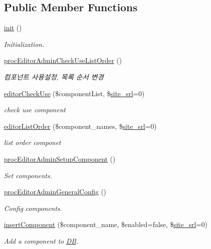 \subsection*{Public Member Functions}
\begin{DoxyCompactItemize}
\item 
\hyperlink{classeditorAdminController_ad93d747ea21b3414d423dcb8b3b54760}{init} ()
\begin{DoxyCompactList}\small\item\em Initialization. \end{DoxyCompactList}\item 
\hyperlink{classeditorAdminController_a00e9dceb8f8bc86baf8edbac76e3d5fd}{proc\+Editor\+Admin\+Check\+Use\+List\+Order} ()
\begin{DoxyCompactList}\small\item\em 컴포넌트 사용설정, 목록 순서 변경 \end{DoxyCompactList}\item 
\hyperlink{classeditorAdminController_ae4663ef7946d055274d39810ef76198a}{editor\+Check\+Use} (\$component\+List, \$\hyperlink{ko_8install_8php_a8b1406b4ad1048041558dce6bfe89004}{site\+\_\+srl}=0)
\begin{DoxyCompactList}\small\item\em check use component \end{DoxyCompactList}\item 
\hyperlink{classeditorAdminController_a531785272cc7a46e86dce7a308a18286}{editor\+List\+Order} (\$component\+\_\+names, \$\hyperlink{ko_8install_8php_a8b1406b4ad1048041558dce6bfe89004}{site\+\_\+srl}=0)
\begin{DoxyCompactList}\small\item\em list order componet \end{DoxyCompactList}\item 
\hyperlink{classeditorAdminController_a42b74f6454a6b5f75a2029c13452e0b8}{proc\+Editor\+Admin\+Setup\+Component} ()
\begin{DoxyCompactList}\small\item\em Set components. \end{DoxyCompactList}\item 
\hyperlink{classeditorAdminController_ad24e312c55f5bd02a7d7e03dad843157}{proc\+Editor\+Admin\+General\+Config} ()
\begin{DoxyCompactList}\small\item\em Config components. \end{DoxyCompactList}\item 
\hyperlink{classeditorAdminController_a38775ee5db2277eb943096661ae25fd9}{insert\+Component} (\$component\+\_\+name, \$enabled=false, \$\hyperlink{ko_8install_8php_a8b1406b4ad1048041558dce6bfe89004}{site\+\_\+srl}=0)
\begin{DoxyCompactList}\small\item\em Add a component to \hyperlink{classDB}{DB}. \end{DoxyCompactList}\end{DoxyCompactItemize}
